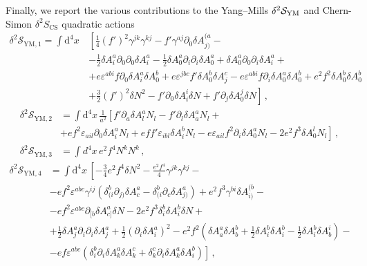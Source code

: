 Finally, we report the various contributions to the Yang--Mills $\delta^2 \mathcal{S}_{\rm YM}$ and Chern-Simon $\delta^2 S_{\text{CS}}$ quadratic actions
\begin{align}
\delta^2 \mathcal{S}_{\text{YM},1}  = \int \textrm{d}^4 x\, & \left[\frac{1}{4} \left(f'\right)^2 \gamma^{jk} \gamma^{kj} - f' \gamma^{aj} \partial_0 \delta A^{(a}_{j)} - \right. \nonumber \\
& -\frac{1}{2} \delta A^a_i \partial_0\partial_0 \delta A^a_i  - \frac{1}{2} \delta A^a_0 \partial_i \partial_i  \delta A^a_0 +  \delta A^a_0 \partial_0 \partial_i \delta A^a_i + \nonumber \\
& + e \varepsilon^{abi}  f \partial_0 \delta A^a_i \delta A^b_0 + e \varepsilon^{jbc} f' \delta A^b_0 \delta A^c_j - e \varepsilon^{abi}  f \partial_i \delta A^a_0 \delta A^b_0 + e^2 f^2 \delta A^b_0 \delta A^b_0 \nonumber \\
& \left.+ \frac{3}{2} \left(f'\right)^2 \delta N^2 - f' \partial_0 \delta A^i_i \delta N + f' \partial_j \delta A^j_0 \delta N \right] \,,
\end{align}
\begin{align}
\delta^2 \mathcal{S}_{\text{YM},2} & = \int \textrm{d}^4 x \, \frac{1}{a^2} \left[f' \partial_a \delta A^a_l N_l -  f' \partial_l \delta A^a_a N_l + \right. \nonumber \\
& \left. + e f^2 \varepsilon_{ail} \partial_0 \delta A^a_i N_l + e f f' \varepsilon_{ibl} \delta A^b_i N_l - e \varepsilon_{ail} f^2 \partial_i \delta A^a_0 N_l - 2 e^2 f^3 \delta A^l_0 N_l \right] \,, \\
\delta^2 \mathcal{S}_{\text{YM},3} & = \int d^4 x\, e^2 f^4 N^k N^k \,,
\end{align}
\begin{align}
\delta^2 \mathcal{S}_{\text{YM},4} & =  \int \textrm{d}^4 x \, \left[-\frac{3}{4} e^2 f^4 \delta N^2 -\frac{e^2 f^4}{4} \gamma^{jk} \gamma^{kj} -\right. \nonumber \\
& - e f^2 \varepsilon^{abc} \gamma^{ij} \left( \delta^b_{(i} \partial_{j)} \delta A^a_{c} - \delta^b_{(i} \partial_{c} \delta A^a_{j)} \right) + e^2 f^3 \gamma^{bi} \delta A^{(b}_{i)} - \nonumber \\
& - e f^2 \varepsilon^{abc}  \partial_{[b} \delta A^a_{c]} \delta N - 2 e^2 f^3 \delta^b_i \delta A^b_i \delta N + \nonumber \\
& + \frac{1}{2} \delta A^a_j \partial_i \partial_i \delta A^a_j + \frac{1}{2} (\partial_i \delta A^a_i)^2 - e^2 f^2 \left( \delta A^a_a \delta A^b_b + \frac{1}{2} \delta A^b_i \delta A^b_i - \frac{1}{2} \delta A^b_i \delta A^i_b \right) - \nonumber \\
& \left. - e f \varepsilon^{abc} \left( \delta^b_i \partial_i \delta A^a_k \delta A^c_k + \delta^c_k \partial_i \delta A^a_k \delta A^b_i \right) \right] \,,
\end{align}
